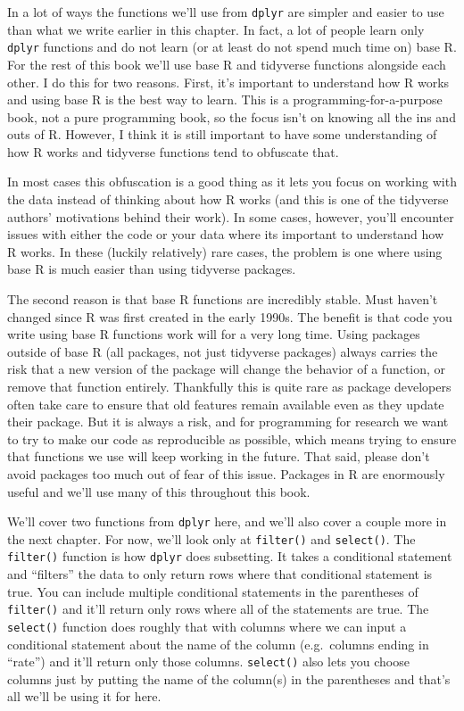\documentclass[
]{krantz}
\begin{document}
In a lot of ways the functions we'll use from \texttt{dplyr} are simpler and easier to use than what we write earlier in this chapter. In fact, a lot of people learn only \texttt{dplyr} functions and do not learn (or at least do not spend much time on) base R. For the rest of this book we'll use base R and tidyverse functions alongside each other. I do this for two reasons. First, it's important to understand how R works and using base R is the best way to learn. This is a programming-for-a-purpose book, not a pure programming book, so the focus isn't on knowing all the ins and outs of R. However, I think it is still important to have some understanding of how R works and tidyverse functions tend to obfuscate that.

In most cases this obfuscation is a good thing as it lets you focus on working with the data instead of thinking about how R works (and this is one of the tidyverse authors' motivations behind their work). In some cases, however, you'll encounter issues with either the code or your data where its important to understand how R works. In these (luckily relatively) rare cases, the problem is one where using base R is much easier than using tidyverse packages.

The second reason is that base R functions are incredibly stable. Must haven't changed since R was first created in the early 1990s. The benefit is that code you write using base R functions work will for a very long time. Using packages outside of base R (all packages, not just tidyverse packages) always carries the risk that a new version of the package will change the behavior of a function, or remove that function entirely. Thankfully this is quite rare as package developers often take care to ensure that old features remain available even as they update their package. But it is always a risk, and for programming for research we want to try to make our code as reproducible as possible, which means trying to ensure that functions we use will keep working in the future. That said, please don't avoid packages too much out of fear of this issue. Packages in R are enormously useful and we'll use many of this throughout this book.

We'll cover two functions from \texttt{dplyr} here, and we'll also cover a couple more in the next chapter. For now, we'll look only at \texttt{filter()} and \texttt{select()}. The \texttt{filter()} function is how \texttt{dplyr} does subsetting. It takes a conditional statement and ``filters'' the data to only return rows where that conditional statement is true. You can include multiple conditional statements in the parentheses of \texttt{filter()} and it'll return only rows where all of the statements are true. The \texttt{select()} function does roughly that with columns where we can input a conditional statement about the name of the column (e.g.~columns ending in ``rate'') and it'll return only those columns. \texttt{select()} also lets you choose columns just by putting the name of the column(s) in the parentheses and that's all we'll be using it for here.
\end{document}
